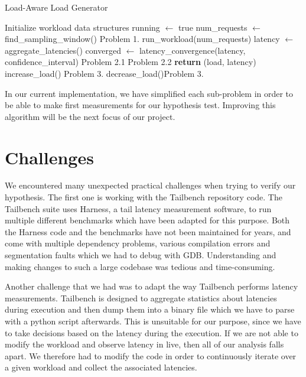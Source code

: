 \documentclass[12pt]{article}
\begin{document}
\begin{algorithm}
	\caption{Load-Aware Load Generator}\label{alg:cap}
	\begin{algorithmic}[1]
		\STATE Initialize workload data structures
		\STATE running $\gets$ true
		\STATE num\_requests $\gets$ find\_sampling\_window() \hfill Problem 1.
		\STATE run\_workload(num\_requests)
		\STATE latency $\gets$ aggregate\_latencies()
		\STATE converged $\gets$ latency\_convergence(latency, confidence\_interval) \hfill Problem 2.1
		 \hfill Problem 2.2
		\STATE \textbf{return} (load, latency) 
		\STATE increase\_load() \hfill Problem 3.
		\STATE decrease\_load()\hfill Problem 3.
		\ENDIF
		\ENDIF
		\ENDWHILE
	\end{algorithmic}
\end{algorithm}

\noindent In our current implementation, we have simplified each sub-problem in order to be able to make first measurements for our hypothesis test. Improving this algorithm will be the next focus of our project.

\singlespacing


\section{Challenges}

We encountered many unexpected practical challenges when trying to verify our hypothesis. The first one is working with the Tailbench repository code. The Tailbench suite uses Harness, a tail latency measurement software, to run multiple different benchmarks which have been adapted for this purpose. Both the Harness code and the benchmarks have not been maintained for years, and come with multiple dependency problems, various compilation errors and segmentation faults which we had to debug with GDB.  Understanding and making changes to such a large codebase was tedious and time-consuming.

\singlespacing

\noindent Another challenge that we had was to adapt the way Tailbench performs latency measurements. Tailbench is designed to aggregate statistics about latencies during execution and then dump them into a binary file which we have to parse with a python script afterwards. This is unsuitable for our purpose, since we have to take decisions based on the latency during the execution. If we are not able to modify the workload and observe latency in live, then all of our analysis falls apart. We therefore had to modify the code in order to continuously iterate over a given workload and collect the associated latencies.
\end{document}
